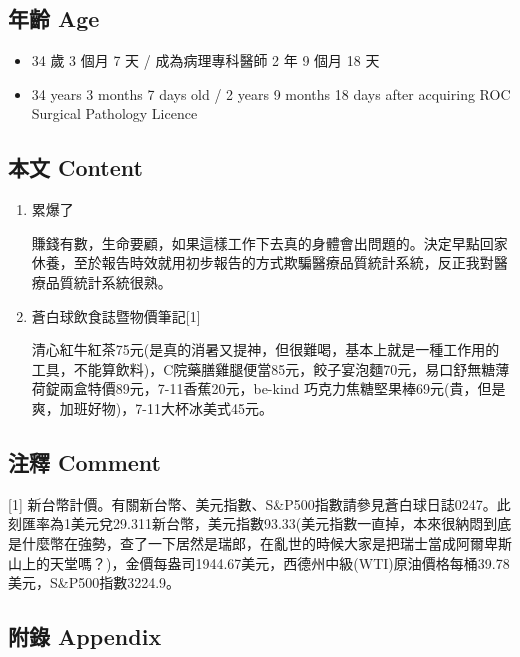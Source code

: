 \documentclass[a5paper, 11pt
]{book}
\providecommand{\tightlist}{%
  \setlength{\itemsep}{0pt}\setlength{\parskip}{0pt}}
\begin{document}
\hypertarget{ux5e74ux9f61-age-51}{%
\subsection{年齡 Age}\label{ux5e74ux9f61-age-51}}

\begin{itemize}
\tightlist
\item
  34 歲 3 個月 7 天 / 成為病理專科醫師 2 年 9 個月 18 天
\item
  34 years 3 months 7 days old / 2 years 9 months 18 days after
  acquiring ROC Surgical Pathology Licence
\end{itemize}

\hypertarget{ux672cux6587-content-51}{%
\subsection{本文 Content}\label{ux672cux6587-content-51}}

\begin{enumerate}
\def\labelenumi{\arabic{enumi}.}
\item
  累爆了

  賺錢有數，生命要顧，如果這樣工作下去真的身體會出問題的。決定早點回家休養，至於報告時效就用初步報告的方式欺騙醫療品質統計系統，反正我對醫療品質統計系統很熟。
\item
  蒼白球飲食誌暨物價筆記{[}1{]}

  清心紅牛紅茶75元(是真的消暑又提神，但很難喝，基本上就是一種工作用的工具，不能算飲料)，C院藥膳雞腿便當85元，餃子宴泡麵70元，易口舒無糖薄荷錠兩盒特價89元，7-11香蕉20元，be-kind
  巧克力焦糖堅果棒69元(貴，但是爽，加班好物)，7-11大杯冰美式45元。
\end{enumerate}

\hypertarget{ux6ce8ux91cb-comment-51}{%
\subsection{注釋 Comment}\label{ux6ce8ux91cb-comment-51}}

{[}1{]}
新台幣計價。有關新台幣、美元指數、S\&P500指數請參見蒼白球日誌0247。此刻匯率為1美元兌29.311新台幣，美元指數93.33(美元指數一直掉，本來很納悶到底是什麼幣在強勢，查了一下居然是瑞郎，在亂世的時候大家是把瑞士當成阿爾卑斯山上的天堂嗎？)，金價每盎司1944.67美元，西德州中級(WTI)原油價格每桶39.78美元，S\&P500指數3224.9。

\hypertarget{ux9644ux9304-appendix-51}{%
\subsection{附錄 Appendix}\label{ux9644ux9304-appendix-51}}
\end{document}
